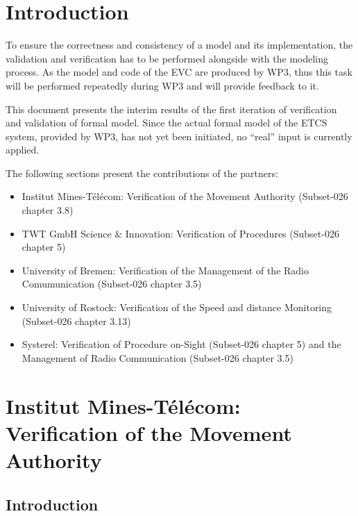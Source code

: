 \documentclass{template/openetcs_article}
\begin{document}



\section{Introduction}

To ensure the correctness and consistency of a model and its implementation, the
validation and verification has to be performed alongside with the modeling process. 
As the model and code of the EVC are produced by WP3,
thus this task will be performed repeatedly during WP3 and will provide
feedback to it.

This document presents the interim results of the first iteration of
verification and validation of formal model.
Since the actual formal model of the ETCS system, provided by WP3, has not
yet been initiated, no ``real'' input is currently applied.

The following sections present the contributions of the partners: 
\begin{itemize}
  \item Institut Mines-Télécom: Verification of the Movement Authority (Subset-026~\cite{unisig_subset-026_2012} chapter 3.8)
  \item TWT GmbH Science \& Innovation: Verification of Procedures (Subset-026 chapter 5)
  \item University of Bremen: Verification of the Management of the Radio
  Comumunication (Subset-026 chapter 3.5)
  \item University of Rostock: Verification of the Speed and distance  Monitoring  (Subset-026 chapter 3.13)
  \item Systerel: Verification of Procedure on-Sight (Subset-026 chapter 5) and the Management of Radio Communication (Subset-026 chapter 3.5)
\end{itemize}

\newpage
\section{Institut Mines-Télécom: Verification of the Movement Authority}

\subsection{Introduction}
\end{document}
